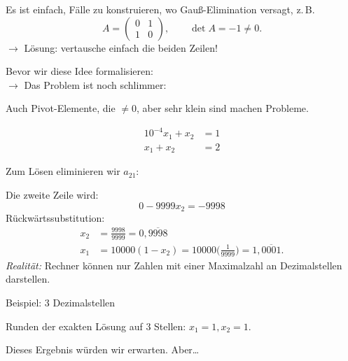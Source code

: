Es ist einfach, Fälle zu konstruieren, wo Gauß-Elimination versagt, z.\,B.
\begin{equation*}
A =
\begin{pmatrix}
0 & 1 \\
1 & 0
\end{pmatrix},
\qquad
\det A = -1 \neq 0.
\end{equation*}
$\rightarrow$ Lösung: vertausche einfach die beiden Zeilen!

\bigskip

Bevor wir diese Idee formalisieren:
\\$\rightarrow$ Das Problem ist noch schlimmer:

\medskip

Auch Pivot-Elemente, die $\neq 0$, aber sehr klein sind machen Probleme.
\begin{bsp}
\begin{align*}
10^{-4} x_1 + x_2 & = 1 \\
        x_1 + x_2 & = 2
\end{align*}

\medskip

Zum Lösen eliminieren wir $a_{21}$:

Die zweite Zeile wird:
\begin{equation*}
0 - 9999x_2 = -9998
\end{equation*}
Rückwärtssubstitution:
\begin{align*}
x_2 & = \frac{9998}{9999} = 0{,}\overline{9998} \\
%
x_1 & = 10000(1-x_2) = 10000\Big(\frac{1}{9999}\Big) = 1{,}\overline{0001}.
\end{align*}
\emph{Realität:} Rechner können nur Zahlen mit einer Maximalzahl an Dezimalstellen
darstellen.

\medskip

Beispiel: 3 Dezimalstellen

\medskip

Runden der exakten Lösung auf $3$ Stellen: $x_1 = 1, x_2 = 1$.

\medskip

Dieses Ergebnis würden wir erwarten. Aber\dots
\bigskip


\end{bsp}
